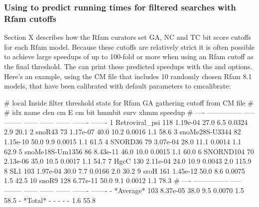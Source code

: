\subsubsection{Using  to predict running times for
  filtered searches with Rfam cutoffs}
Section X describes how the Rfam curators set GA, NC and TC bit score
cutoffs for each Rfam model. Because these cutoffs are relatively
strict it is often possible to achieve large speedups of up to
100-fold or more when using an Rfam cutoff as the final threshold. The
 can print these predicted speedups with the  and  options. Here's an example, using the
 CM file that includes 10 randomly chosen Rfam
8.1 models, that have been calibrated with default parameters to
cmcalibrate:


\begin{sreoutput}
# local Inside filter threshold stats for Rfam GA gathering cutoff from CM file
#
#  idx  name              clen      cm E  cm bit  hmmbit    surv     xhmm  speedup
# ----  ---------------  -----  --------  ------  ------  ------  -------  -------
     1  Retroviral_psi     118  1.19e-04    27.0     6.5  0.0324      2.9     20.1
     2  snoR43              73  1.17e-07    40.0    10.2  0.0016      1.1     58.6
     3  snoMe28S-U3344      82  1.15e-10    50.0     9.9  0.0015      1.1     61.5
     4  SNORD36             79  3.07e-04    28.0    11.1  0.0014      1.1     62.9
     5  snoMe18S-Um1356     86  8.43e-11    46.0    10.0  0.0015      1.1     60.0
     6  SNORND104           70  2.13e-06    35.0    10.5  0.0017      1.1     54.7
     7  HgcC               130  2.11e-04    24.0    10.9  0.0043      2.0    115.9
     8  SL1                103  1.97e-04    30.0     7.7  0.0166      2.0     30.2
     9  sroH               161  1.45e-12    50.0     8.6  0.0075      1.5     42.5
    10  snoR9              128  6.77e-11    50.0     9.1  0.0012      1.1     78.3
# ----  ---------------  -----  --------  ------  ------  ------  -------  -------
     -  *Average*          103  8.37e-05    38.0     9.5  0.0070      1.5     58.5
     -  *Total*              -         -       -       -       -      1.6     55.8
\end{sreoutput}

